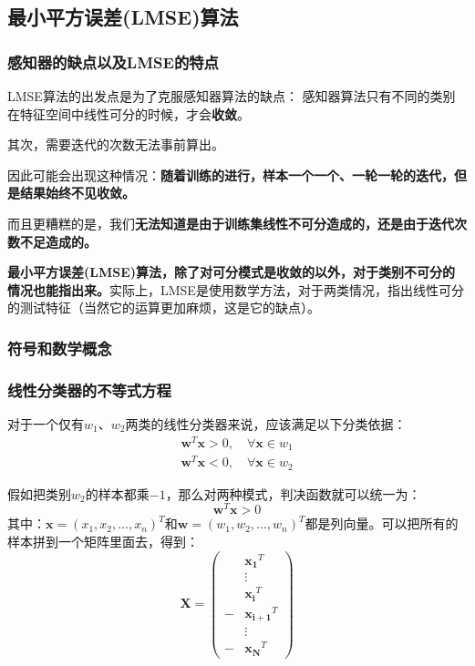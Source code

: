 \documentclass[12pt, letterpaper]{article}
\begin{document}
\subsection{最小平方误差(LMSE)算法}
\subsubsection{感知器的缺点以及LMSE的特点}
LMSE算法的出发点是为了克服感知器算法的缺点：
感知器算法只有不同的类别在特征空间中线性可分的时候，才会\textbf{收敛}。

其次，需要迭代的次数无法事前算出。

因此可能会出现这种情况：\textbf{随着训练的进行，样本一个一个、一轮一轮的迭代，但是结果始终不见收敛。}

而且更糟糕的是，我们\textbf{无法知道是由于训练集线性不可分造成的，还是由于迭代次数不足造成的。}

\textbf{最小平方误差(LMSE)算法，除了对可分模式是收敛的以外，对于类别不可分的情况也能指出来。}实际上，LMSE是使用数学方法，对于两类情况，指出线性可分的测试特征（当然它的运算更加麻烦，这是它的缺点）。

\subsubsection{符号和数学概念}
\subsubsection*{线性分类器的不等式方程}
对于一个仅有$w_1$、$w_2$两类的线性分类器来说，应该满足以下分类依据：
$$
\begin{aligned}
\mathbf{w}^T\mathbf{x}>0,\quad \forall \mathbf{x}\in w_1\\
\mathbf{w}^T\mathbf{x}<0,\quad \forall \mathbf{x}\in w_2
\end{aligned}
$$

假如把类别$w_2$的样本都乘$-1$，那么对两种模式，判决函数就可以统一为：
$$
\mathbf{w}^T\mathbf{x}>0
$$
其中：$\mathbf{x}=(x_1,x_2,\ldots,x_n)^T$和$\mathbf{w}=(w_1,w_2,\ldots,w_n)^T$都是列向量。可以把所有的样本拼到一个矩阵里面去，得到：
$$
\mathbf{X}=\left(
\begin{aligned}
&\mathbf{x_1}^T\\
&\vdots \\
&\mathbf{x_i}^T\\
-&\mathbf{x_{i+1}}^T\\
&\vdots \\
-&\mathbf{x_N}^T
\end{aligned}
\right)
$$
\end{document}
